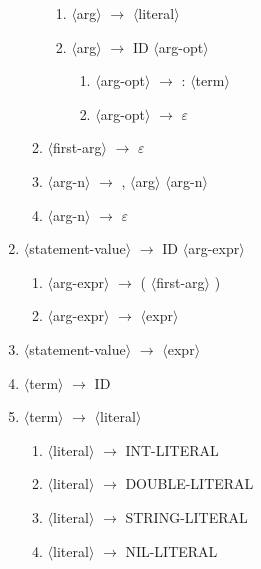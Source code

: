 \documentclass[a4paper]{article}
\newcommand{\red}[1]{{\color{red} #1}}
\begin{document}
\begin{enumerate}
\begin{enumerate}
          \begin{enumerate}
                \item $\langle$arg$\rangle$ $\rightarrow$ $\langle$literal$\rangle$
                \item $\langle$arg$\rangle$ $\rightarrow$ \red{ID} $\langle$arg-opt$\rangle$
                \begin{enumerate}
                    \item $\langle$arg-opt$\rangle$ $\rightarrow$ \red{:} $\langle$term$\rangle$
                    \item $\langle$arg-opt$\rangle$ $\rightarrow$ \red{$\varepsilon$}
                \end{enumerate}
          \end{enumerate}
    \item $\langle$first-arg$\rangle$ $\rightarrow$ \red{$\varepsilon$}
    \item $\langle$arg-n$\rangle$ $\rightarrow$ \red{,} $\langle$arg$\rangle$ $\langle$arg-n$\rangle$
    \item $\langle$arg-n$\rangle$ $\rightarrow$ \red{$\varepsilon$}
\end{enumerate}
\item $\langle$statement-value$\rangle$ $\rightarrow$ \red{ID} $\langle$arg-expr$\rangle$
\begin{enumerate}
    \item $\langle$arg-expr$\rangle$ $\rightarrow$ \red{(} $\langle$first-arg$\rangle$ \red{)}
    \item $\langle$arg-expr$\rangle$ $\rightarrow$ $\langle$expr$\rangle$
\end{enumerate}
\item $\langle$statement-value$\rangle$ $\rightarrow$ $\langle$expr$\rangle$
\item $\langle$term$\rangle$ $\rightarrow$ \red{ID}
\item $\langle$term$\rangle$ $\rightarrow$ $\langle$literal$\rangle$
\begin{enumerate}
    \item $\langle$literal$\rangle$ $\rightarrow$ \red{INT-LITERAL}
    \item $\langle$literal$\rangle$ $\rightarrow$ \red{DOUBLE-LITERAL}
    \item $\langle$literal$\rangle$ $\rightarrow$ \red{STRING-LITERAL}
    \item $\langle$literal$\rangle$ $\rightarrow$ \red{NIL-LITERAL}
\end{enumerate}
\end{enumerate}
\end{document}
